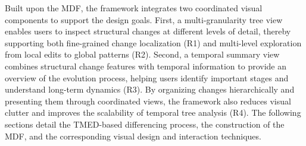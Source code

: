 Built upon the MDF, the framework integrates two coordinated visual components to support the design goals. First, a multi-granularity tree view enables users to inspect structural changes at different levels of detail, thereby supporting both fine-grained change localization (R1) and multi-level exploration from local edits to global patterns (R2). Second, a temporal summary view combines structural change features with temporal information to provide an overview of the evolution process, helping users identify important stages and understand long-term dynamics (R3). By organizing changes hierarchically and presenting them through coordinated views, the framework also reduces visual clutter and improves the scalability of temporal tree analysis (R4). The following sections detail the TMED-based differencing process, the construction of the MDF, and the corresponding visual design and interaction techniques.

